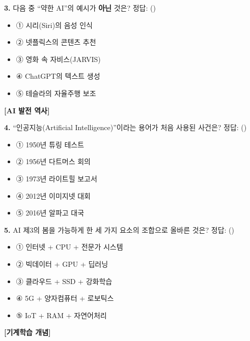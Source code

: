 \documentclass[11pt,a4paper]{article}
\begin{document}
\bigskip

\noindent\textbf{3.} 다음 중 ``약한 AI''의 예시가 \textbf{아닌} 것은? \hfill 정답: (\hspace{1.5cm})

\begin{itemize}[leftmargin=2em, label={}]
    \item ① 시리(Siri)의 음성 인식
    \item ② 넷플릭스의 콘텐츠 추천
    \item ③ 영화 속 자비스(JARVIS)
    \item ④ ChatGPT의 텍스트 생성
    \item ⑤ 테슬라의 자율주행 보조
\end{itemize}

\bigskip

\noindent\textbf{[AI 발전 역사]}

\bigskip

\noindent\textbf{4.} ``인공지능(Artificial Intelligence)''이라는 용어가 처음 사용된 사건은? \hfill 정답: (\hspace{1.5cm})

\begin{itemize}[leftmargin=2em, label={}]
    \item ① 1950년 튜링 테스트
    \item ② 1956년 다트머스 회의
    \item ③ 1973년 라이트힐 보고서
    \item ④ 2012년 이미지넷 대회
    \item ⑤ 2016년 알파고 대국
\end{itemize}

\bigskip

\noindent\textbf{5.} AI 제3의 봄을 가능하게 한 세 가지 요소의 조합으로 올바른 것은? \hfill 정답: (\hspace{1.5cm})

\begin{itemize}[leftmargin=2em, label={}]
    \item ① 인터넷 + CPU + 전문가 시스템
    \item ② 빅데이터 + GPU + 딥러닝
    \item ③ 클라우드 + SSD + 강화학습
    \item ④ 5G + 양자컴퓨터 + 로보틱스
    \item ⑤ IoT + RAM + 자연어처리
\end{itemize}

\newpage

\noindent\textbf{[기계학습 개념]}
\end{document}
